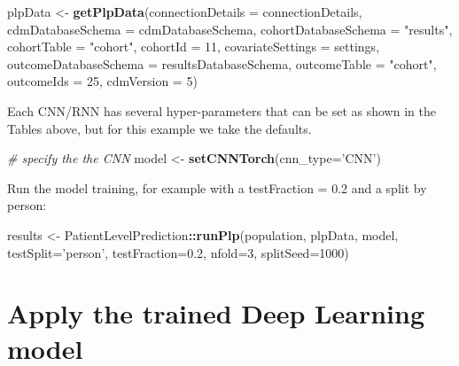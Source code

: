 \documentclass[]{article}
\newenvironment{Shaded}{\begin{snugshade}}{\end{snugshade}}
\newcommand{\KeywordTok}[1]{\textcolor[rgb]{0.13,0.29,0.53}{\textbf{#1}}}
\newcommand{\DataTypeTok}[1]{\textcolor[rgb]{0.13,0.29,0.53}{#1}}
\newcommand{\DecValTok}[1]{\textcolor[rgb]{0.00,0.00,0.81}{#1}}
\newcommand{\FloatTok}[1]{\textcolor[rgb]{0.00,0.00,0.81}{#1}}
\newcommand{\StringTok}[1]{\textcolor[rgb]{0.31,0.60,0.02}{#1}}
\newcommand{\CommentTok}[1]{\textcolor[rgb]{0.56,0.35,0.01}{\textit{#1}}}
\newcommand{\OperatorTok}[1]{\textcolor[rgb]{0.81,0.36,0.00}{\textbf{#1}}}
\newcommand{\NormalTok}[1]{#1}
\begin{document}
\begin{Shaded}
\begin{Highlighting}[]
\NormalTok{plpData <-}\StringTok{ }\KeywordTok{getPlpData}\NormalTok{(}\DataTypeTok{connectionDetails =}\NormalTok{ connectionDetails,}
                        \DataTypeTok{cdmDatabaseSchema =}\NormalTok{ cdmDatabaseSchema,}
                        \DataTypeTok{cohortDatabaseSchema =} \StringTok{"results"}\NormalTok{,}
                        \DataTypeTok{cohortTable =} \StringTok{"cohort"}\NormalTok{,}
                        \DataTypeTok{cohortId =} \DecValTok{11}\NormalTok{,}
                        \DataTypeTok{covariateSettings =}\NormalTok{ settings,}
                        \DataTypeTok{outcomeDatabaseSchema =}\NormalTok{ resultsDatabaseSchema,}
                        \DataTypeTok{outcomeTable =} \StringTok{"cohort"}\NormalTok{,}
                        \DataTypeTok{outcomeIds =} \DecValTok{25}\NormalTok{,}
                        \DataTypeTok{cdmVersion =} \DecValTok{5}\NormalTok{)}
\end{Highlighting}
\end{Shaded}

Each CNN/RNN has several hyper-parameters that can be set as shown in
the Tables above, but for this example we take the defaults.

\begin{Shaded}
\begin{Highlighting}[]
\CommentTok{# specify the the CNN}
\NormalTok{model <-}\StringTok{ }\KeywordTok{setCNNTorch}\NormalTok{(}\DataTypeTok{cnn_type=}\StringTok{'CNN'}\NormalTok{)}
\end{Highlighting}
\end{Shaded}

Run the model training, for example with a testFraction = 0.2 and a
split by person:

\begin{Shaded}
\begin{Highlighting}[]
\NormalTok{results <-}\StringTok{ }\NormalTok{PatientLevelPrediction}\OperatorTok{::}\KeywordTok{runPlp}\NormalTok{(population, plpData, model,}
                                          \DataTypeTok{testSplit=}\StringTok{'person'}\NormalTok{,}
                                          \DataTypeTok{testFraction=}\FloatTok{0.2}\NormalTok{,}
                                          \DataTypeTok{nfold=}\DecValTok{3}\NormalTok{, }
                                          \DataTypeTok{splitSeed=}\DecValTok{1000}\NormalTok{) }
\end{Highlighting}
\end{Shaded}

\section{Apply the trained Deep Learning
model}\label{apply-the-trained-deep-learning-model}
\end{document}
